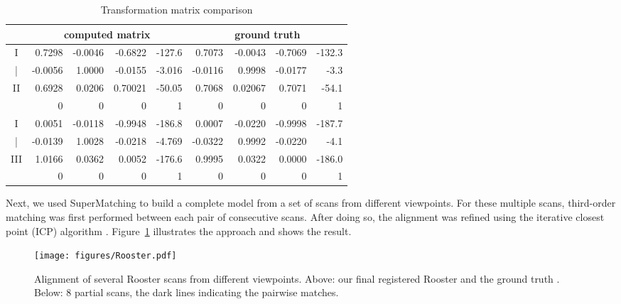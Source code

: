 \begin{table}[tb]
\centering
\tabcolsep=1pt
\setlength{\aboverulesep}{0pt}
\setlength{\belowrulesep}{0pt}
\caption{Transformation matrix comparison}
\hspace{-5ex}
\label{tab:matrix}
\small
\begin{tabular}{c |rrrr |rrrr}
\toprule
 & \multicolumn{4}{|c|}{ {computed matrix}} & \multicolumn{4}{c}{ {ground truth}} \\
\hline
{I} & {0.7298} 	& {-0.0046}   & {-0.6822}	& {-127.6}  & {0.7073} 	& {-0.0043}   & {-0.7069}	& {-132.3}   \\
{|}&{-0.0056}     &  {1.0000}	& {-0.0155} & {-3.016}  & {-0.0116}	& {0.9998}	& {-0.0177}	& {-3.3}   \\
{II}&{0.6928}	    & {0.0206}	& {0.70021}	& {-50.05}  & {0.7068}     & {0.02067}   & {0.7071}	& {-54.1}   \\
&{0}             & {0}	        & {0}	        & {1}          & {0}             & {0}	        & {0}	        & {1}          \\
\hline
{I} & {0.0051} & {-0.0118} &  {-0.9948} & {-186.8}          & {0.0007} & {-0.0220} &  {-0.9998} & {-187.7}  \\
{|}  &{-0.0139} & {1.0028} &{-0.0218} & {-4.769}  	&{-0.0322} & {0.9992} &{-0.0220} & {-4.1}   \\
{III} &{1.0166} & {0.0362} &{0.0052} &{-176.6}       &{0.9995} & {0.0322} &{0.0000} &{-186.0}  \\
&        {0}             & {0}	        & {0}	        & {1}          & {0}             & {0}	        & {0}	        & {1}          \\
\bottomrule
\end{tabular}%
\end{table}%


Next, we used SuperMatching to build a complete model from a set of scans from different viewpoints.
For these multiple scans, third-order matching was first performed between each pair of consecutive scans.
After doing so, the alignment was refined using the iterative closest point (ICP) algorithm \cite{Besl92}.
Figure~\ref{fig:3DRigid} illustrates the approach and shows the result.

\begin{figure}[t!]
\centering
  \texttt{[image: figures/Rooster.pdf]}
  \caption{Alignment of several Rooster scans from different viewpoints.
  Above: our final registered Rooster and the ground truth \cite{Chuang09}. Below: 8 partial scans, the dark lines indicating the pairwise matches.}
\label{fig:3DRigid}
\end{figure}

